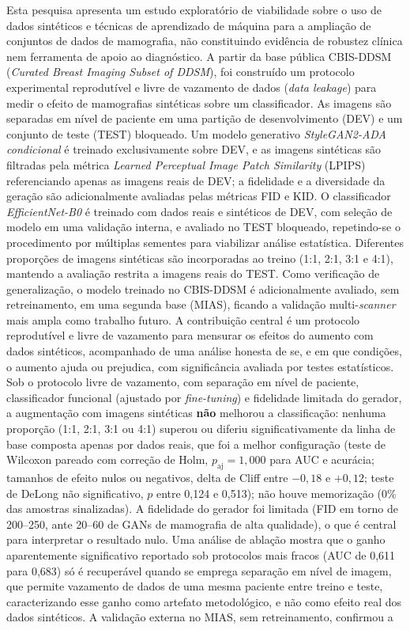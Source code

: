 \documentclass[
	12pt,				%
	openright,			%
	oneside,			%
	a4paper,			%
	tcc,			%
	]{ABNT-DC-UEL}
\begin{document}
\begin{resumo}
 Esta pesquisa apresenta um estudo exploratório de viabilidade sobre o uso de dados sintéticos e técnicas de aprendizado de máquina para a ampliação de conjuntos de dados de mamografia, não constituindo evidência de robustez clínica nem ferramenta de apoio ao diagnóstico. A partir da base pública CBIS-DDSM (\textit{Curated Breast Imaging Subset of DDSM}), foi construído um protocolo experimental reprodutível e livre de vazamento de dados (\textit{data leakage}) para medir o efeito de mamografias sintéticas sobre um classificador. As imagens são separadas em nível de paciente em uma partição de desenvolvimento (DEV) e um conjunto de teste (TEST) bloqueado. Um modelo generativo \textit{StyleGAN2-ADA condicional} é treinado exclusivamente sobre DEV, e as imagens sintéticas são filtradas pela métrica \textit{Learned Perceptual Image Patch Similarity} (LPIPS) referenciando apenas as imagens reais de DEV; a fidelidade e a diversidade da geração são adicionalmente avaliadas pelas métricas FID e KID. O classificador \textit{EfficientNet-B0} é treinado com dados reais e sintéticos de DEV, com seleção de modelo em uma validação interna, e avaliado no TEST bloqueado, repetindo-se o procedimento por múltiplas sementes para viabilizar análise estatística. Diferentes proporções de imagens sintéticas são incorporadas ao treino (1:1, 2:1, 3:1 e 4:1), mantendo a avaliação restrita a imagens reais do TEST. Como verificação de generalização, o modelo treinado no CBIS-DDSM é adicionalmente avaliado, sem retreinamento, em uma segunda base (MIAS), ficando a validação multi-\textit{scanner} mais ampla como trabalho futuro. A contribuição central é um protocolo reprodutível e livre de vazamento para mensurar os efeitos do aumento com dados sintéticos, acompanhado de uma análise honesta de se, e em que condições, o aumento ajuda ou prejudica, com significância avaliada por testes estatísticos. Sob o protocolo livre de vazamento, com separação em nível de paciente, classificador funcional (ajustado por \textit{fine-tuning}) e fidelidade limitada do gerador, a augmentação com imagens sintéticas \textbf{não} melhorou a classificação: nenhuma proporção (1:1, 2:1, 3:1 ou 4:1) superou ou diferiu significativamente da linha de base composta apenas por dados reais, que foi a melhor configuração (teste de Wilcoxon pareado com correção de Holm, $p_{\text{aj}} = 1{,}000$ para AUC e acurácia; tamanhos de efeito nulos ou negativos, delta de Cliff entre $-0{,}18$ e $+0{,}12$; teste de DeLong não significativo, $p$ entre 0,124 e 0,513); não houve memorização (0\% das amostras sinalizadas). A fidelidade do gerador foi limitada (FID em torno de 200--250, ante 20--60 de GANs de mamografia de alta qualidade), o que é central para interpretar o resultado nulo. Uma análise de ablação mostra que o ganho aparentemente significativo reportado sob protocolos mais fracos (AUC de 0,611 para 0,683) só é recuperável quando se emprega separação em nível de imagem, que permite vazamento de dados de uma mesma paciente entre treino e teste, caracterizando esse ganho como artefato metodológico, e não como efeito real dos dados sintéticos. A validação externa no MIAS, sem retreinamento, confirmou a 
\end{resumo}
\end{document}
